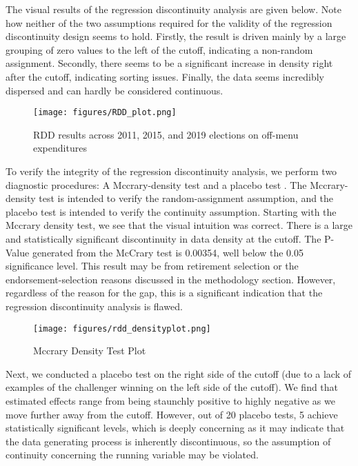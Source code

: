 The visual results of the regression discontinuity analysis are given below. 
Note how neither of the two assumptions required for the validity of the regression discontinuity design seems to hold. 
Firstly, the result is driven mainly by a large grouping of zero values to the left of the cutoff, indicating a non-random assignment. 
Secondly, there seems to be a significant increase in density right after the cutoff, indicating sorting issues. 
Finally, the data seems incredibly dispersed and can hardly be considered continuous. 

\begin{figure}[H]
    \centering
    \texttt{[image: figures/RDD\_plot.png]}
        \caption{RDD results across 2011, 2015, and 2019 elections on off-menu expenditures}
\end{figure}

To verify the integrity of the regression discontinuity analysis, we perform two diagnostic procedures: A Mccrary-density test and a placebo test \cite{MCCRARY2008698}. 
The Mccrary-density test is intended to verify the random-assignment assumption, and the placebo test is intended to verify the continuity assumption. 
Starting with the Mccrary density test, we see that the visual intuition was correct. 
There is a large and statistically significant discontinuity in data density at the cutoff. 
The P-Value generated from the McCrary test is 0.00354, well below the 0.05 significance level. 
This result may be from retirement selection or the endorsement-selection reasons discussed in the methodology section. 
However, regardless of the reason for the gap, this is a significant indication that the regression discontinuity analysis is flawed.

\begin{figure}[H]
    \centering
    \texttt{[image: figures/rdd\_densityplot.png]}
    \caption{Mccrary Density Test Plot}
\end{figure}

Next, we conducted a placebo test on the right side of the cutoff (due to a lack of examples of the challenger winning on the left side of the cutoff). 
We find that estimated effects range from being staunchly positive to highly negative as we move further away from the cutoff. 
However, out of 20 placebo tests, 5 achieve statistically significant levels, which is deeply concerning as it may indicate that the data generating process is inherently discontinuous, so the assumption of continuity concerning the running variable may be violated. 


